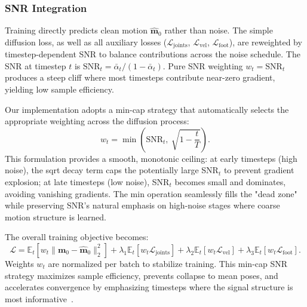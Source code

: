\subsubsection{SNR Integration}
Training directly predicts clean motion $\hat{\mathbf{m}}_0$ rather than noise. The simple diffusion loss, as well as all auxiliary losses ($\mathcal{L}_{\text{joints}}$, $\mathcal{L}_{\text{vel}}$, $\mathcal{L}_{\text{foot}}$), are reweighted by timestep-dependent SNR to balance contributions across the noise schedule. The SNR at timestep $t$ is $\text{SNR}_t = \bar{\alpha}_t / (1-\bar{\alpha}_t)$. Pure SNR weighting $w_t = \text{SNR}_t$ produces a steep cliff where most timesteps contribute near-zero gradient, yielding low sample efficiency.

Our implementation adopts a min-cap strategy that automatically selects the appropriate weighting across the diffusion process:
\[
w_t = \min\left( \text{SNR}_t,\ \sqrt{1 - \frac{t}{T}} \right).
\]
This formulation provides a smooth, monotonic ceiling: at early timesteps (high noise), the sqrt decay term caps the potentially large SNR$_t$ to prevent gradient explosion; at late timesteps (low noise), SNR$_t$ becomes small and dominates, avoiding vanishing gradients. The min operation seamlessly fills the "dead zone" while preserving SNR's natural emphasis on high-noise stages where coarse motion structure is learned.

The overall training objective becomes:
\[
\mathcal{L} = \mathbb{E}_t [ w_t \|\mathbf{m}_0 - \hat{\mathbf{m}}_0\|_2^2 ] + \lambda_1 \mathbb{E}_t [ w_t \mathcal{L}_{\text{joints}} ] + \lambda_2 \mathbb{E}_t [ w_t \mathcal{L}_{\text{vel}} ] + \lambda_3 \mathbb{E}_t [ w_t \mathcal{L}_{\text{foot}} ].
\]
Weights $w_t$ are normalized per batch to stabilize training. This min-cap SNR strategy maximizes sample efficiency, prevents collapse to mean poses, and accelerates convergence by emphasizing timesteps where the signal structure is most informative~\cite{minsnr2024}.